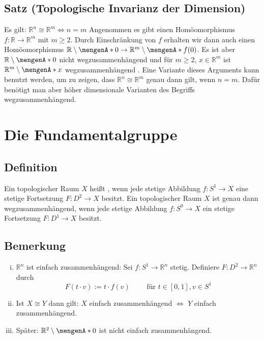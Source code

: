 \subsection{Satz (Topologische Invarianz der Dimension)} %
\label{sub:84}
Es gilt: $\mathds{R}^n \cong \mathds{R}^m \iff n=m$
Angenommen es gibt einen Homöomorphismus $f : \mathds{R} \to \mathds{R}^m$ mit $m \ge 2$. Durch Einschränkung von $f$ erhalten wir dann auch einen Homöomorphismus 
$\mathds{R} \setminus\set{0} \to \mathds{R}^m \setminus \set{f(0)}$. Es ist aber $\mathds{R} \setminus \set{0}$ nicht wegzusammenhängend und für 
$m \ge 2$, $x \in \mathds{R}^m$ ist $\mathds{R}^m \setminus \set{x}$ wegzusammenhängend \light. \bewende
{}
Eine Variante dieses Arguments kann benutzt werden, um zu zeigen, dass $\mathds{R}^n \cong \mathds{R}^m$ genau dann gilt, wenn $n=m$. Dafür benötigt man aber höher dimensionale 
Varianten des Begriffs wegzusammenhängend.
\newpage

\section{Die Fundamentalgruppe} %
\label{sec:9}

\subsection[Definition: Einfach zusammenhängender topologischer Raum]{Definition} %
\label{sub:91}
Ein topologischer Raum $X$ heißt , wenn jede stetige Abbildung $f : S^1 \to X$ eine stetige
Fortsetzung $F : D^2 \to X$ besitzt.
Ein topologischer Raum $X$ ist genau dann wegzusammenhängend, wenn jede stetige Abbildung $f : S^0 \to X$ ein stetige Fortsetzung $F : D^1 \to X$ besitzt.

\subsection[Bemerkungen zu einfach zusammenhängenden Räumen]{Bemerkung} %
\label{sub:92}
\begin{enumerate}[(i)]
	\item $\mathds{R}^n$ ist einfach zusammenhängend: Sei $f : S^1 \to \mathds{R}^n$ stetig. Definiere $F : D^2 \to \mathds{R}^n$ durch
	\[
		F(t \cdot v) := t \cdot f(v) \qquad \text{ für } t \in [0,1], v \in S^1
	\]
	\item Ist $X \cong Y$ dann gilt: $X$ einfach zusammenhängend $\Leftrightarrow$ $Y$ einfach zusammenhängend.
	\item Später: $\mathds{R}^2 \setminus \set{0}$ ist nicht einfach zusammenhängend.
\end{enumerate}

